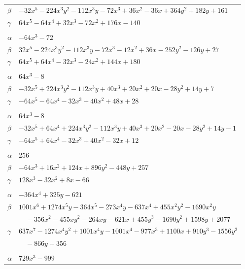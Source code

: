 \documentclass[11pt]{article}
\begin{document}
\begin{longtable}{@{}ll@{}}
$\beta$ & $-32x^{5}-224x^{3}y^{2}-112x^{3}y-72x^{3}+36x^{2}-36x+364y^{2}+182y+161$\\
$\gamma$ & $64x^{5}-64x^{4}+32x^{3}-72x^{2}+176x-140$\\
\addlinespace[3pt]
\multicolumn{2}{@{}l}{$\{i,j\}=\{8,11\}$, $k_{ij}=3^{3}\cdot 5$}\\
$\alpha$ & $-64x^{3}-72$\\
$\beta$ & $32x^{5}-224x^{3}y^{2}-112x^{3}y-72x^{3}-12x^{2}+36x-252y^{2}-126y+27$\\
$\gamma$ & $64x^{5}+64x^{4}-32x^{3}-24x^{2}+144x+180$\\
\addlinespace[3pt]
\multicolumn{2}{@{}l}{$\{i,j\}=\{9,11\}$, $k_{ij}=13$}\\
$\alpha$ & $64x^{3}-8$\\
$\beta$ & $-32x^{5}+224x^{3}y^{2}-112x^{3}y+40x^{3}+20x^{2}+20x-28y^{2}+14y+7$\\
$\gamma$ & $-64x^{5}-64x^{4}-32x^{3}+40x^{2}+48x+28$\\
\addlinespace[3pt]
\multicolumn{2}{@{}l}{$\{i,j\}=\{9,12\}$, $k_{ij}=5$}\\
$\alpha$ & $64x^{3}-8$\\
$\beta$ & $-32x^{5}+64x^{4}+224x^{3}y^{2}-112x^{3}y+40x^{3}+20x^{2}-20x-28y^{2}+14y-1$\\
$\gamma$ & $-64x^{5}+64x^{4}-32x^{3}+40x^{2}-32x+12$\\
\addlinespace[3pt]
\multicolumn{2}{@{}l}{$\{i,j\}=\{9,13\}$, $k_{ij}=5\cdot 13$}\\
$\alpha$ & $256$\\
$\beta$ & $-64x^{3}+16x^{2}+124x+896y^{2}-448y+257$\\
$\gamma$ & $128x^{3}-32x^{2}+8x-66$\\
\addlinespace[3pt]
\multicolumn{2}{@{}l}{$\{i,j\}=\{10,15\}$, $k_{ij}=2^{2}\cdot 5^{2}\cdot 11$}\\
$\alpha$ & $-364x^{4}+325y-621$\\
$\beta$ & $1001x^{6}+1274x^{5}y-364x^{5}-273x^{4}y-637x^{4}+455x^{2}y^{2}-1690x^{2}y$\\
 & $\quad -356x^{2}-455xy^{2}-264xy-621x+455y^{3}-1690y^{2}+1598y+2077$\\
$\gamma$ & $637x^{7}-1274x^{4}y^{2}+1001x^{4}y-1001x^{4}-977x^{3}+1100x+910y^{3}-1556y^{2}$\\
 & $\quad -866y+356$\\
\addlinespace[3pt]
\multicolumn{2}{@{}l}{$\{i,j\}=\{10,20\}$, $k_{ij}=2^{4}\cdot 5^{2}$}\\
$\alpha$ & $729x^{3}-999$\\

\end{longtable}
\end{document}
